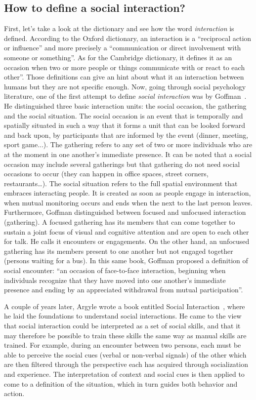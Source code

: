 \documentclass[a4paper,11pt,twoside]{StyleThese}
\begin{document}
\subsection{How to define a social interaction?}
First, let’s take a look at the dictionary and see how the word \emph{interaction} is defined. According to the Oxford dictionary, an interaction is a ``reciprocal action or influence'' and more precisely a ``communication or direct involvement with someone or something''. As for the Cambridge dictionary, it defines it as an occasion when two or more people or things communicate with or react to each other''. Those definitions can give an hint about what it an interaction between humans but they are not specific enough. Now, going through social psychology literature, one of the first attempt to define \emph{social interaction} was by Goffman~\cite{goffman_1967_interaction}. He distinguished three basic interaction units: the social occasion, the gathering and the social situation. The social occasion is an event that is temporally and spatially situated in such a way that it forms a unit that can be looked forward and back upon, by participants that are informed by the event (dinner, meeting, sport game...). The gathering refers to any set of two or more individuals who are at the moment in one another’s immediate presence. It can be noted that a social occasion may include several gatherings but that gathering do not need social occasions to occur (they can happen in office spaces, street corners, restaurants…). The social situation refers to the full spatial environment that embraces interacting people. It is created as soon as people engage in interaction, when mutual monitoring occurs and ends when the next to the last person leaves. Furthermore, Goffman distinguished between focused and unfocused interaction (gathering). A focused gathering has its members that can come together to sustain a joint focus of visual and cognitive attention and are open to each other for talk. He calls it encounters or engagements. On the other hand, an unfocused gathering has its members present to one another but not engaged together (\eg persons waiting for a bus). In this same book, Goffman proposed a definition of social encounter: ``an occasion of face-to-face interaction, beginning when individuals recognize that they have moved into one another’s immediate presence and ending by an appreciated withdrawal from mutual participation''.

A couple of years later, Argyle wrote a book entitled Social Interaction~\cite{argyle_1973_social}, where he laid the foundations to understand social interactions. He came to the view that social interaction could be interpreted as a set of social skills, and that it may therefore be possible to train these skills the same way as manual skills are trained. For example, during an encounter between two persons, each must be able to perceive the social cues (verbal or non-verbal signals) of the other which are then filtered through the perspective each has acquired through socialization and experience.  The interpretation of context and social cues is then applied to come to a definition of the situation, which in turn guides both behavior and action.
\end{document}
